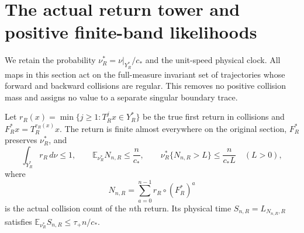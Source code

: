 \section{The actual return tower and positive finite-band likelihoods}
\label{sec:av-return-likelihood}

We retain the probability $\nu_R^*=\nu|_{Y_R^*}/c_*$ and the
unit-speed physical clock.  All maps in this section act on the
full-measure invariant set of trajectories whose forward and backward
collisions are regular.  This removes no positive collision mass and
assigns no value to a separate singular boundary trace.

\begin{lemma}
\label{lem:av-tower}
Let $r_R(x)=\min\{j\ge1:T_R^jx\in Y_R^*\}$ be the true first
return in collisions and $F_R^*x=T_R^{r_R(x)}x$.  The return is finite
almost everywhere on the original section, $F_R^*$ preserves
$\nu_R^*$, and
\begin{equation}\label{eq:av-tower-moment}
 \int_{Y_R^*}r_R\,d\nu\le1,\qquad
 \mathbb E_{\nu_R^*}N_{n,R}\le\frac{n}{c_*},\qquad
 \nu_R^*\{N_{n,R}>L\}\le\frac{n}{c_*L}\quad(L>0),
\end{equation}
where
\[
 N_{n,R}=\sum_{a=0}^{n-1}r_R\circ(F_R^*)^a
\]
is the actual collision count of the $n$th return.  Its physical time
$S_{n,R}=L_{N_{n,R},R}$ satisfies
$\mathbb E_{\nu_R^*}S_{n,R}\le\tau_+n/c_*$.
\end{lemma}
